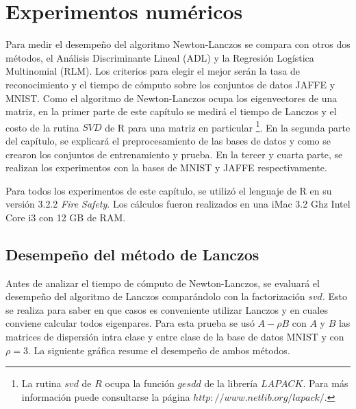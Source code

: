 \chapter{Experimentos numéricos}
\label{ch:chapter4}

Para medir el desempeño del algoritmo Newton-Lanczos se compara con otros dos métodos, el Análisis Discriminante Lineal (ADL) y la Regresión Logística Multinomial (RLM). Los criterios para elegir el mejor serán la tasa de reconocimiento y el tiempo de cómputo sobre los conjuntos de datos JAFFE y MNIST. Como el algoritmo de Newton-Lanczos ocupa los eigenvectores de una matriz, en la primer parte de este capítulo se medirá el tiempo de Lanczos y el costo de la rutina $SVD$ de R para una matriz en particular \footnote{La rutina $svd$ de $R$ ocupa la función $gesdd$ de la librería $LAPACK$. Para más información puede consultarse la página $http://www.netlib.org/lapack/$.}. En la segunda parte del capítulo, se explicará el preprocesamiento de las bases de datos y como se crearon los conjuntos de entrenamiento y prueba. En la tercer y cuarta parte, se realizan los experimentos con la bases de MNIST y JAFFE respectivamente. 

Para todos los experimentos de este capítulo, se utilizó el lenguaje de \textsf{R} en su versión 3.2.2 \textit{Fire Safety}. Los cálculos fueron realizados en una iMac 3.2 Ghz Intel Core i3 con 12 GB de RAM.

\section{Desempeño del método de Lanczos}

Antes de analizar el tiempo de cómputo de Newton-Lanczos, se evaluará el desempeño del algoritmo de Lanczos comparándolo con la factorización $svd$. Esto se realiza para saber en que casos es conveniente utilizar Lanczos y en cuales conviene calcular todos eigenpares. Para esta prueba se usó $A - \rho B$ con $A$ y $B$ las matrices de dispersión intra clase y entre clase de la base de datos MNIST y con $\rho = 3$. La siguiente gráfica resume el desempeño de ambos métodos.

